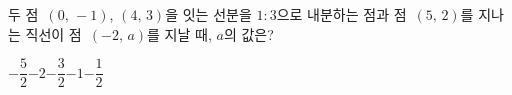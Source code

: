 두 점~$(0,\,-1)$, $(4,\,3)$을 잇는 선분을 $1:3$으로 내분하는 점과 점~$(5,\,2)$를 지나는 직선이 점~$(-2,\,a)$를 지날 때, $a$의 값은?
\begin{choices32}{$-\dfrac{5}{2}$}{$-2$}{$-\dfrac{3}{2}$}{$-1$}{$-\dfrac{1}{2}$}\end{choices32}
